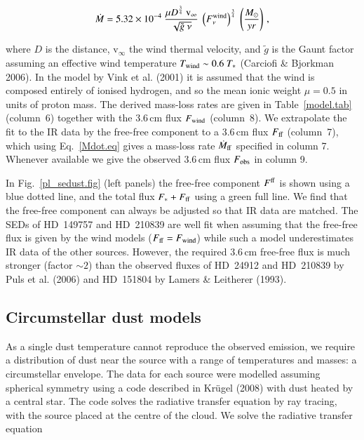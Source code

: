 \documentclass[tradiabstract]{aa} %
\begin{document}
\begin{equation} \label{Mdot.eq}
  \dot{M} = 5.32 \times 10^{-4} \ \frac{\mu
    D^{\frac{3}{4}}\ \rm{v}_{\infty}}{\sqrt{\tilde{g} \ \nu}}
  \ \left(F^{\rm{wind}}_{\nu} \right)^{\frac{3}{4}} \ \left(
  \frac{M_{\odot}}{yr} \right) \,
,\end{equation}
 
where { $D$ is the distance}, v$_{\infty}$ the wind thermal velocity,
and $\tilde{g}$ is the Gaunt factor assuming an effective wind
temperature $T_{\rm {wind}} \sim 0.6 \ T_{*}$ (Carciofi \& Bjorkman
2006). { {In the model by Vink et al. (2001) it is assumed}} that the
wind is composed entirely of ionised hydrogen, and so the mean ionic
weight $\mu = 0.5$ in units of proton mass. The derived mass-loss
rates are given in Table~\ref{model.tab} (column~6) together with the
3.6\,cm flux $F_{\rm {wind}}$ (column~8).  We extrapolate the fit to the
IR data by the free-free component to a 3.6\,cm flux $F_{\rm{ff}}$
(column~7), which using Eq.~\ref{Mdot.eq} gives a mass-loss rate
$\dot{M}_{\rm {ff}}$ specified in column 7. Whenever available we give
the observed 3.6\,cm flux $F_{\rm{obs}}$ in column 9.

In Fig.~\ref{pl_sedust.fig} (left panels) the free-free component
$F^{\rm {ff}}$ is shown using a blue dotted line, and the total flux $F_{*}
+F_{\rm{ff}}$ using a green full line. We find that the free-free component
can always be adjusted so that IR data are matched.  The SEDs of
HD~149757 and HD~210839 are well fit when assuming that the free-free
flux is given by the wind models ($F_{\rm{ff}}=F_{\rm {wind}}$) while
such a model underestimates IR data of the other sources. However, the
required 3.6\,cm free-free flux is much stronger (factor $\sim 2$)
than the observed fluxes of HD~24912 and HD~210839 by Puls et
al. (2006) and HD~151804 by Lamers \& Leitherer (1993).





\subsection{Circumstellar dust models}

As a single dust temperature cannot reproduce the observed emission,
we require a distribution of dust near the source with a range of
temperatures and masses: a circumstellar envelope. The data for each
source were modelled assuming spherical symmetry using a code described
in Kr\"ugel (2008) with dust heated by a central star. The code solves
the radiative transfer equation by ray tracing, with the source placed
at the centre of the cloud. We solve the radiative transfer equation
\end{document}
